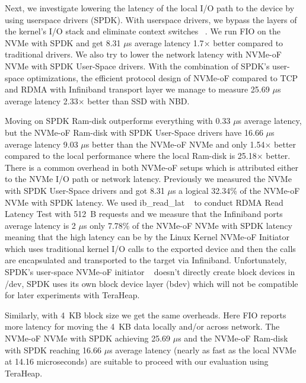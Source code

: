 Next, we investigate lowering the latency of the local I/O path to the device by using userspace drivers (SPDK). With userspace drivers, we bypass the layers of the kernel's I/O stack and eliminate context switches ~\cite{spdk}. We run FIO on the NVMe with SPDK and get 8.31 $\mu$s average latency 1.7$\times$ better compared to traditional drivers. We also try to lower
the network latency with NVMe-oF NVMe with SPDK User-Space drivers. With the combination of SPDK’s user-space optimizations, the efficient protocol design of NVMe-oF compared to TCP and RDMA with Infiniband transport layer we manage to measure 25.69 $\mu$s average latency 2.33$\times$ better than SSD with NBD. 

Moving on SPDK Ram-disk outperforms everything with 0.33 $\mu$s average latency,
but the NVMe-oF Ram-disk with SPDK User-Space drivers have 16.66 $\mu$s average
latency 9.03 $\mu$s better than the NVMe-oF NVMe and only 1.54$\times$ better
compared to the local performance where the local Ram-disk is 25.18$\times$
better. There is a common overhead in both NVMe-oF setups which is attributed
either to the NVMe I/O path or network latency. Previously we measured the NVMe
with SPDK User-Space drivers and got 8.31 $\mu$s a logical 32.34\% of the
NVMe-oF NVMe with SPDK latency. We used ib\_read\_lat ~\cite{perftest} to
conduct RDMA Read Latency Test with \SI{512}{B} requests and we measure that the
Infiniband ports average latency is 2 $\mu$s only 7.78\% of the NVMe-oF NVMe
with SPDK latency meaning that the high latency can be by the Linux Kernel
NVMe-oF Initiator which uses traditional kernel I/O calls to the exported device
and then the calls are encapsulated and transported to the target via
Infiniband. Unfortunately, SPDK's user-space NVMe-oF initiator ~\cite{spdk}
doesn't directly create block devices in /dev, SPDK uses its own block
device layer (bdev) which will not be compatible for later experiments with TeraHeap. 

Similarly, with \SI{4}{KB} block size we get the same overheads. Here FIO reports more latency for moving the \SI{4}{KB} data locally
and/or across network. The NVMe-oF NVMe with SPDK achieving 25.69 $\mu$s and the
NVMe-oF Ram-disk with SPDK reaching 16.66 $\mu$s average latency (nearly as fast
as the local NVMe at 14.16 microseconds) are suitable to proceed with our
evaluation using TeraHeap.

